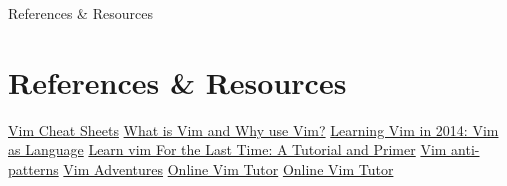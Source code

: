 \documentclass{beamer}
\begin{document}
\begin{frame}{References \& Resources}
  \section{References \& Resources}

  \begin{thebibliography}{10}
      \href{https://rumorscity.com/2014/08/16/5-best-vim-cheat-sheet/}{Vim Cheat Sheets}
      \href{https://medium.com/@fay_jai/what-is-vim-and-why-use-vim-54c67ce3c18e}{What is Vim and Why use Vim?}
      \href{https://benmccormick.org/2014/07/02/learning-vim-in-2014-vim-as-language}{Learning Vim in 2014: Vim as Language}
      \href{https://danielmiessler.com/study/vim/?fb_ref=118ef0e03ab54c0d8197214328648a68-Hackernews}{Learn vim For the Last Time: A Tutorial and Primer}
      \href{https://sanctum.geek.nz/arabesque/vim-anti-patterns/}{Vim anti-patterns}
      \href{https://vim-adventures.com/}{Vim Adventures}
      \href{https://www.openvim.com/}{Online Vim Tutor}
      \href{https://www.openvim.com/}{Online Vim Tutor}

  \end{thebibliography}

\end{frame}
\end{document}
